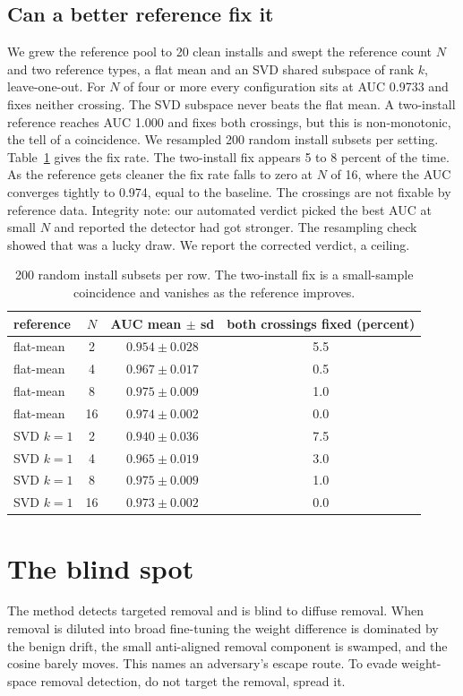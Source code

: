 \documentclass[11pt]{article}
\begin{document}
\subsection{Can a better reference fix it}
We grew the reference pool to 20 clean installs and swept the reference count $N$
and two reference types, a flat mean and an SVD shared subspace of rank $k$,
leave-one-out. For $N$ of four or more every configuration sits at AUC 0.9733 and
fixes neither crossing. The SVD subspace never beats the flat mean. A two-install
reference reaches AUC 1.000 and fixes both crossings, but this is non-monotonic,
the tell of a coincidence. We resampled 200 random install subsets per setting.
Table~\ref{tab:resample} gives the fix rate. The two-install fix appears 5 to 8
percent of the time. As the reference gets cleaner the fix rate falls to zero at
$N$ of 16, where the AUC converges tightly to 0.974, equal to the baseline. The
crossings are not fixable by reference data. Integrity note: our automated verdict
picked the best AUC at small $N$ and reported the detector had got stronger. The
resampling check showed that was a lucky draw. We report the corrected verdict, a
ceiling.

\begin{table}[ht]
\centering
\caption{200 random install subsets per row. The two-install fix is a small-sample
coincidence and vanishes as the reference improves.}
\label{tab:resample}
\begin{tabular}{lccc}
\toprule
reference & $N$ & AUC mean $\pm$ sd & both crossings fixed (percent) \\
\midrule
flat-mean & 2 & $0.954 \pm 0.028$ & 5.5 \\
flat-mean & 4 & $0.967 \pm 0.017$ & 0.5 \\
flat-mean & 8 & $0.975 \pm 0.009$ & 1.0 \\
flat-mean & 16 & $0.974 \pm 0.002$ & 0.0 \\
SVD $k=1$ & 2 & $0.940 \pm 0.036$ & 7.5 \\
SVD $k=1$ & 4 & $0.965 \pm 0.019$ & 3.0 \\
SVD $k=1$ & 8 & $0.975 \pm 0.009$ & 1.0 \\
SVD $k=1$ & 16 & $0.973 \pm 0.002$ & 0.0 \\
\bottomrule
\end{tabular}
\end{table}

\section{The blind spot}
The method detects targeted removal and is blind to diffuse removal. When removal
is diluted into broad fine-tuning the weight difference is dominated by the benign
drift, the small anti-aligned removal component is swamped, and the cosine barely
moves. This names an adversary's escape route. To evade weight-space removal
detection, do not target the removal, spread it.
\end{document}
